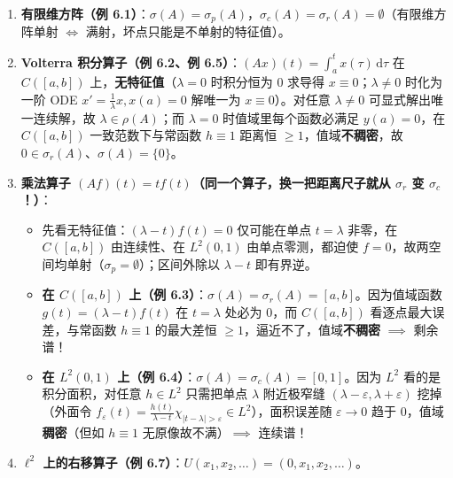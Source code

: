 \documentclass[11pt,a4paper]{article}
\providecommand{\tightlist}{\setlength{\itemsep}{1.8pt}\setlength{\parskip}{0pt}}
\begin{document}
\begin{enumerate}
\def\labelenumi{\arabic{enumi}.}
\tightlist
\item
  \textbf{有限维方阵（例 6.1）}：\(\sigma(A) = \sigma_p(A)\)，\(\sigma_c(A) = \sigma_r(A) = \emptyset\)（有限维方阵单射 \(\iff\) 满射，坏点只能是不单射的特征值）。
\item
  \textbf{Volterra 积分算子（例 6.2、例 6.5）}：\((Ax)(t) = \int_a^t x(\tau)\,\mathrm{d}\tau\) 在 \(C([a,b])\) 上，\textbf{无特征值}（\(\lambda = 0\) 时积分恒为 \(0\) 求导得 \(x\equiv 0\)；\(\lambda \neq 0\) 时化为一阶 ODE \(x' = \frac{1}{\lambda}x, x(a)=0\) 解唯一为 \(x\equiv 0\)）。对任意 \(\lambda \neq 0\) 可显式解出唯一连续解，故 \(\lambda \in \rho(A)\)；而 \(\lambda = 0\) 时值域里每个函数必满足 \(y(a)=0\)，在 \(C([a,b])\) 一致范数下与常函数 \(h \equiv 1\) 距离恒 \(\ge 1\)，值域\textbf{不稠密}，故 \(0 \in \sigma_r(A)\)、\(\sigma(A) = \{0\}\)。
\item
  \textbf{乘法算子 \((Af)(t) = t f(t)\)（同一个算子，换一把距离尺子就从 \(\sigma_r\) 变 \(\sigma_c\)！）}：

  \begin{itemize}
  \tightlist
  \item
    先看无特征值：\((\lambda - t)f(t) = 0\) 仅可能在单点 \(t=\lambda\) 非零，在 \(C([a,b])\) 由连续性、在 \(L^2(0,1)\) 由单点零测，都迫使 \(f = 0\)，故两空间均单射（\(\sigma_p = \emptyset\)）；区间外除以 \(\lambda - t\) 即有界逆。
  \item
    \textbf{在 \(C([a,b])\) 上（例 6.3）}：\(\sigma(A) = \sigma_r(A) = [a,b]\)。因为值域函数 \(g(t)=(\lambda-t)f(t)\) 在 \(t=\lambda\) 处必为 \(0\)，而 \(C([a,b])\) 看逐点最大误差，与常函数 \(h \equiv 1\) 的最大差恒 \(\ge 1\)，逼近不了，值域\textbf{不稠密} \(\implies\) 剩余谱！
  \item
    \textbf{在 \(L^2(0,1)\) 上（例 6.4）}：\(\sigma(A) = \sigma_c(A) = [0,1]\)。因为 \(L^2\) 看的是积分面积，对任意 \(h \in L^2\) 只需把单点 \(\lambda\) 附近极窄缝 \((\lambda-\varepsilon, \lambda+\varepsilon)\) 挖掉（外面令 \(f_\varepsilon(t) = \frac{h(t)}{\lambda-t}\chi_{|t-\lambda|>\varepsilon} \in L^2\)），面积误差随 \(\varepsilon \to 0\) 趋于 \(0\)，值域\textbf{稠密}（但如 \(h\equiv 1\) 无原像故不满）\(\implies\) 连续谱！
  \end{itemize}
\item
  \textbf{\(\ell^2\) 上的右移算子（例 6.7）}：\(U(x_1, x_2, \dots) = (0, x_1, x_2, \dots)\)。


\end{enumerate}
\end{document}
